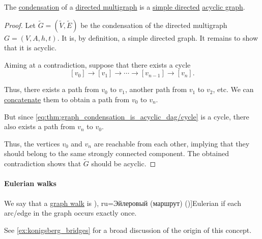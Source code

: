 \begin{proposition}\label{thm:graph_condensation_is_acyclic_dag}
  The \hyperref[def:directed_graph_condensation]{condensation} of a \hyperref[def:directed_multigraph]{directed multigraph} is a \hyperref[def:directed_graph]{simple directed} \hyperref[def:acyclic_graph]{acyclic graph}.
\end{proposition}
\begin{proof}
  Let \( \widetilde{G} = (\widetilde{V}, \widetilde{E}) \) be the condensation of the directed multigraph \( G = (V, A, h, t) \). It is, by definition, a simple directed graph. It remains to show that it is acyclic.

  Aiming at a contradiction, suppose that there exists a cycle
  \begin{equation}\label{eq:thm:graph_condensation_is_acyclic_dag/cycle}
    [v_0] \to [v_1] \to \cdots \to [v_{n-1}] \to [v_n].
  \end{equation}

  Thus, there exists a path from \( v_0 \) to \( v_1 \), another path from \( v_1 \) to \( v_2 \), etc. We can \hyperref[def:graph_walk/concatenation]{concatenate} them to obtain a path from \( v_0 \) to \( v_n \).

  But since \eqref{eq:thm:graph_condensation_is_acyclic_dag/cycle} is a cycle, there also exists a path from \( v_n \) to \( v_0 \).

  Thus, the vertices \( v_0 \) and \( v_n \) are reachable from each other, implying that they should belong to the same strongly connected component. The obtained contradiction shows that \( \widetilde{G} \) should be acyclic.
\end{proof}

\paragraph{Eulerian walks}

\begin{definition}\label{def:eulerian_walk}
  We say that a \hyperref[def:graph_walk]{graph walk} is \term[bg=Ойлеров (цикъл) (\cite[110]{Мирчев2001Графи}), ru=Эйлеровый (маршрут) (\cite[192]{ЕмеличевИПр1990ТеорияГрафов})]{Eulerian} if each arc/edge in the graph occurs exactly once.
\end{definition}
\begin{comments}
  \item See \cref{ex:konigsberg_bridges} for a broad discussion of the origin of this concept.
\end{comments}

